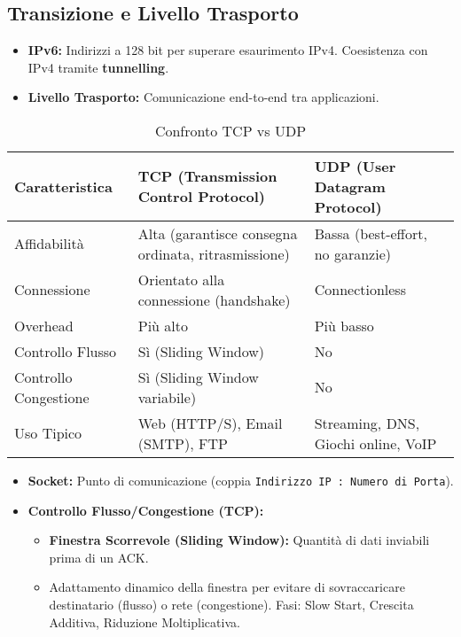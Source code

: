 \subsection{Transizione e Livello Trasporto}
\begin{itemize}
    \item \textbf{IPv6:} Indirizzi a 128 bit per superare esaurimento IPv4. Coesistenza con IPv4 tramite \textbf{tunnelling}.
    \item \textbf{Livello Trasporto:} Comunicazione end-to-end tra applicazioni.
\end{itemize}
\begin{table}[H]
    \centering
    \begin{tabular}{|l|p{5cm}|p{5cm}|}
        \hline
        \rowcolor{bg_custom}
        \textbf{Caratteristica} & \textbf{TCP (Transmission Control Protocol)} & \textbf{UDP (User Datagram Protocol)} \\
        \hline
        Affidabilità & Alta (garantisce consegna ordinata, ritrasmissione) & Bassa (best-effort, no garanzie) \\
        \hline
        Connessione & Orientato alla connessione (handshake) & Connectionless \\
        \hline
        Overhead & Più alto & Più basso \\
        \hline
        Controllo Flusso & Sì (Sliding Window) & No \\
        \hline
        Controllo Congestione & Sì (Sliding Window variabile) & No \\
        \hline
        Uso Tipico & Web (HTTP/S), Email (SMTP), FTP & Streaming, DNS, Giochi online, VoIP \\
        \hline
    \end{tabular}
    \caption{Confronto TCP vs UDP}
\end{table}
\begin{itemize}
    \item \textbf{Socket:} Punto di comunicazione (coppia \texttt{Indirizzo IP : Numero di Porta}).
    \item \textbf{Controllo Flusso/Congestione (TCP):}
    \begin{itemize}
        \item \textbf{Finestra Scorrevole (Sliding Window):} Quantità di dati inviabili prima di un ACK.
        \item Adattamento dinamico della finestra per evitare di sovraccaricare destinatario (flusso) o rete (congestione). Fasi: Slow Start, Crescita Additiva, Riduzione Moltiplicativa.
    \end{itemize}
\end{itemize}

